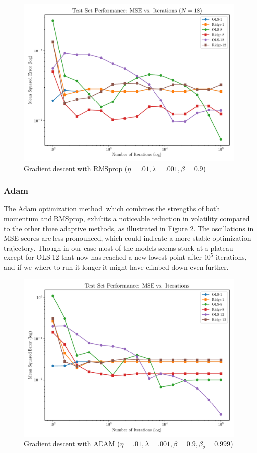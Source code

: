 \documentclass[twocolumn,aps]{revtex4}
\begin{document}
\begin{figure}[h]
    \centering
    \includegraphics[width=.95 \linewidth]{Figures/OLS_Ridge_RMSprop.pdf}
    \caption{Gradient descent with RMSprop ($\eta=.01, \lambda=.001, \beta=0.9$)}
    \label{fig:GradRMSprop}
\end{figure}

\subsubsection{Adam}

The Adam optimization method, which combines the strengths of both momentum and RMSprop, exhibits a noticeable reduction in volatility compared to the other three adaptive methods, as illustrated in Figure \ref{fig:GradADAM}. 
The oscillations in MSE scores are less pronounced, which could indicate a more stable optimization trajectory.
Though in our case most of the models seems stuck at a plateau except for OLS-12 that now has reached a new lowest point after $10^5$ iterations, and if we where to run it longer it might have climbed down even further.
\\

\begin{figure}[h]
    \centering
    \includegraphics[width=.95 \linewidth]{Figures/OLS_Ridge_ADAM.pdf}
    \caption{Gradient descent with ADAM ($\eta=.01, \lambda=.001, \beta=0.9,\beta_2=0.999$)}
    \label{fig:GradADAM}
\end{figure}
\end{document}
